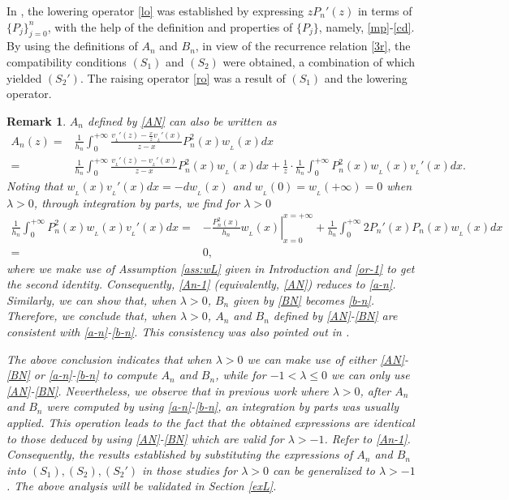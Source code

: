 \documentclass[12pt,a4paper]{article}    %
\newtheorem{remark}{Remark}
\numberwithin{equation}{section}
\begin{document}
In \cite{MinFang25}, the lowering operator \eqref{lo} was established by expressing $zP_n'(z)$ in terms of $\{P_j\}_{j=0}^n$, with the help of the definition and properties of $\{P_j\}$, namely, \eqref{mp}-\eqref{cd}. By using the definitions of $A_n$ and $B_n$, in view of the recurrence relation \eqref{3r}, the compatibility conditions $(S_1)$ and $(S_2)$ were obtained, a combination of which yielded $(S_2')$. The raising operator \eqref{ro} was a result of $(S_1)$ and the lowering operator.

\begin{remark}
$A_n$ defined by \eqref{AN} can also be written as
\begin{align}		 A_n(z)=&\frac{1}{h_n}\int_{0}^{+\infty}\frac{v_{_L}'(z)-\frac{x}{z}v_{_L}'(x)}{z-x}P_n^{2}(x)w_{_L}(x)dx\nonumber\\		 =&\frac{1}{h_n}\int_{0}^{+\infty}\frac{v_{_L}'(z)-v_{_L}'(x)}{z-x}P_n^{2}(x)w_{_L}(x)dx+\frac{1}{z}\cdot \frac{1}{h_n}\int_{0}^{+\infty}P_n^{2}(x)w_{_L}(x)v_{_L}'(x)dx.\label{An-1}
\end{align}
Noting that $w_{_L}(x)v_{_L}'(x)dx=-dw_{_L}(x)$ and $w_{_L}(0)=w_{_L}(+\infty)=0$ when $\lambda>0$, through integration by parts, we find for $\lambda>0$
\begin{align*}
\frac{1}{h_n}\int_{0}^{+\infty}P_n^{2}(x)w_{_L}(x)v_{_L}'(x)dx
=&-\left.\frac{P_n^{2}(x)}{h_n}w_{_L}(x)\right|_{x=0}^{x=+\infty}+\frac{1}{h_n}\int_0^{+\infty}2 P_n'(x)P_n(x)w_{_L}(x)dx\\
=&0,
\end{align*}
where we make use of Assumption \ref{ass:wL} given in Introduction and \eqref{or-1} to get the second identity. Consequently, \eqref{An-1} {\emph(}equivalently, \eqref{AN}{\emph)} reduces to \eqref{a-n}. Similarly, we can show that, when $\lambda>0$, $B_n$ given by \eqref{BN} becomes \eqref{b-n}. Therefore, we conclude that, when $\lambda>0$, $A_n$ and $B_n$ defined by \eqref{AN}-\eqref{BN} are consistent with \eqref{a-n}-\eqref{b-n}. This consistency was also pointed out in \cite[Remark 1]{MinFang25}.

{\sloppy The above conclusion indicates that when $\lambda>0$ we can make use of either \eqref{AN}-\eqref{BN} or \eqref{a-n}-\eqref{b-n} to compute $A_n$ and $B_n$, while for $-1<\lambda\leq0$ we can only use \eqref{AN}-\eqref{BN}. Nevertheless, we observe that in previous work where $\lambda>0$, after $A_n$ and $B_n$ were computed by using \eqref{a-n}-\eqref{b-n}, an integration by parts was usually applied. This operation leads to the fact that the obtained expressions are identical to those deduced by using \eqref{AN}-\eqref{BN} which are valid for $\lambda>-1$. Refer to \eqref{An-1}. Consequently, the results established by substituting the expressions of $A_n$ and $B_n$ into $(S_1), (S_2), (S_2')$ in those studies for $\lambda>0$ can be generalized to $\lambda>-1$. The above analysis will be validated in Section \ref{exL}.}
\end{remark}
\end{document}
